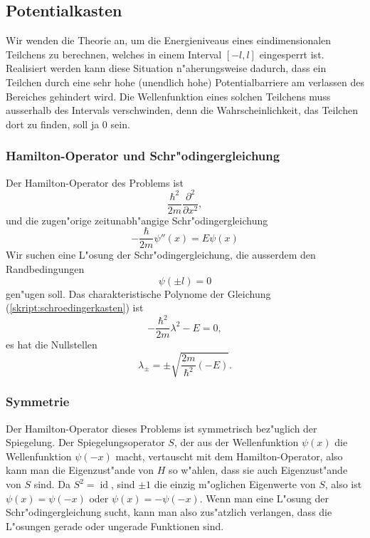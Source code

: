 \subsection{Potentialkasten\label{subsection:potentialkasten}}
Wir wenden die Theorie an, um die Energieniveaus eines eindimensionalen
Teilchens zu berechnen, welches in einem Interval $[-l,l]$ eingesperrt ist.
Realisiert werden kann diese Situation n"aherungsweise dadurch, dass 
ein Teilchen durch eine sehr hohe (unendlich hohe) Potentialbarriere
am verlassen des Bereiches gehindert wird.
Die Wellenfunktion eines solchen Teilchens muss ausserhalb des Intervals
verschwinden, denn die Wahrscheinlichkeit, das Teilchen dort zu
finden, soll ja $0$ sein.

\subsubsection{Hamilton-Operator und Schr"odingergleichung}
Der Hamilton-Operator des Problems ist
\[
\frac{\hbar^2}{2m}\frac{\partial^2}{\partial x^2},
\]
und die zugen"orige zeitunabh"angige Schr"odingergleichung
\begin{equation}
-\frac{\hbar}{2m}\psi''(x)=E\psi(x)
\label{skript:schroedingerkasten}
\end{equation}
Wir suchen eine L"osung der Schr"odingergleichung,
die ausserdem den Randbedingungen
\[
\psi(\pm l)=0
\]
gen"ugen soll.
Das charakteristische Polynome der Gleichung (\ref{skript:schroedingerkasten}) ist
\[
-\frac{\hbar^2}{2m}\lambda^2-E=0,
\]
es hat die Nullstellen
\[
\lambda_\pm = \pm\sqrt{\frac{2m}{\hbar^2}(-E)}.
\]

\subsubsection{Symmetrie}
Der Hamilton-Operator dieses Problems ist symmetrisch bez"uglich
der Spiegelung.
Der Spiegelungsoperator $S$, der aus der Wellenfunktion
$\psi(x)$ die Wellenfunktion $\psi(-x)$ macht, vertauscht mit
dem Hamilton-Operator, also kann man die Eigenzust"ande von $H$ so w"ahlen,
dass sie auch Eigenzust"ande von $S$ sind.
Da $S^2=\operatorname{id}$, sind $\pm1$ die einzig m"oglichen Eigenwerte
von $S$, also ist $\psi(x)=\psi(-x)$ oder $\psi(x)=-\psi(-x)$.
Wenn man eine L"osung der Schr"odingergleichung sucht, kann man also
zus"atzlich verlangen, dass die L"osungen gerade oder ungerade Funktionen
sind.

